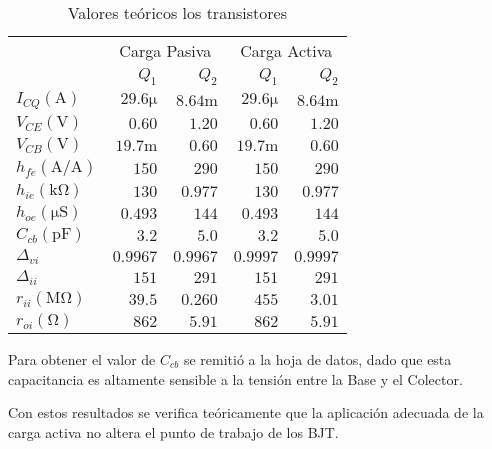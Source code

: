 \begin{table}[ht]
    \centering
    \begin{tabular}{|l|r|r|r|r|}
        \hline
        \multirow{2}{*}{} & \multicolumn{2}{c|}{Carga Pasiva} & \multicolumn{2}{c|}{Carga Activa} \\ \cline{2-5} 
         & $Q_1$ & $Q_2$ & $Q_1$ & $Q_2$ \\ \hline

        $I_{CQ} (\si{\ampere})$ & $29.6 \si{\micro}$& $8.64\si{\milli}$ & $29.6 \si{\micro}$& $8.64\si{\milli}$\\
        $V_{CE} (\si{\volt})$   & $0.60$            & $1.20$ & $0.60$ & $1.20$ \\
        $V_{CB} (\si{\volt})$   & $19.7 \si{\milli}$& $0.60$ & $19.7 \si{\milli}$& $0.60$\\ \hline

        $h_{fe} (\si{\ampere}/\si{\ampere})$ & $150$ & $290$ & $150$ & $290$ \\
        $h_{ie} (\si{\kilo\ohm})$ & $130$ & $0.977$ & $130$ & $0.977$ \\
        $h_{oe} (\si{\micro\siemens})$ & $0.493$ & $144$ & $0.493$ & $144$ \\
        $C_{cb} (\si{\pico\farad})$ & $3.2$ & $5.0$ & $3.2$ & $5.0$ \\ \hline

        $\Delta_{vi}$ & $0.9967$ & $0.9967$ & $0.9997$ & $0.9997$ \\
        $\Delta_{ii}$ & $151$ & $291$ & $151$ & $291$ \\
        $r_{ii} (\si{\mega\ohm})$ & $39.5$ & $0.260$ & $455$ & $3.01$ \\ 
        $r_{oi} (\si{\ohm})$ & $862$ & $5.91$ & $862$ & $5.91$ \\ \hline
    \end{tabular}
    \caption{Valores teóricos los transistores}
    \label{tab:vals_teo}
\end{table}

Para obtener el valor de $C_{cb}$ se remitió a la hoja de datos, dado que esta capacitancia es altamente sensible a la tensión entre la Base y el Colector.

Con estos resultados se verifica teóricamente que la aplicación adecuada de la carga activa no altera el punto de trabajo de los BJT.

